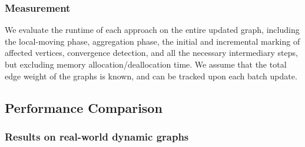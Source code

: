 \subsubsection{Measurement}
\label{sec:measurement}

We evaluate the runtime of each approach on the entire updated graph, including the local-moving phase, aggregation phase, the initial and incremental marking of affected vertices, convergence detection, and all the necessary intermediary steps, but excluding memory allocation/deallocation time. We assume that the total edge weight of the graphs is known, and can be tracked upon each batch update.






\ignore{\label{sec:evaluation--optimality}}



\ignore{}




\subsection{Performance Comparison}
\label{sec:performance-comparison}

\subsubsection{Results on real-world dynamic graphs}

